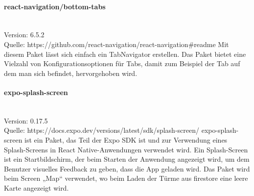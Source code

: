 \paragraph{react-navigation/bottom-tabs}\mbox{}\\
Version: 6.5.2\\
Quelle: https://github.com/react-navigation/react-navigation\#readme
\bigskip
Mit diesem Paket lässt sich einfach ein TabNavigator erstellen. Das Paket bietet eine Vielzahl von Konfigurationsoptionen für Tabs, damit zum Beispiel der Tab auf dem man sich befindet, hervorgehoben wird.

\paragraph{expo-splash-screen}\mbox{}\\
Version: 0.17.5\\
Quelle: https://docs.expo.dev/versions/latest/sdk/splash-screen/
\bigskip
expo-splash-screen ist ein Paket, das Teil der Expo \Gls{SDK} ist und zur Verwendung eines Splash-Screens in React Native-Anwendungen verwendet wird. Ein Splash-Screen ist ein Startbildschirm, der beim Starten der Anwendung angezeigt wird, um dem Benutzer visuelles Feedback zu geben, dass die App geladen wird.
\noindent Das Paket wird beim Screen „Map“ verwendet, wo beim Laden der Türme aus firestore eine leere Karte angezeigt wird.
